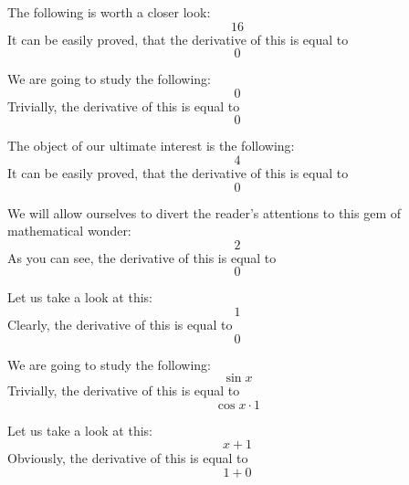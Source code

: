 \documentclass{article}
\begin{document}
The following is worth a closer look:
\begin{equation}
16 
\end{equation}
It can be easily proved, that the derivative of this is equal to
\begin{equation}
0 
\end{equation}

We are going to study the following:
\begin{equation}
0 
\end{equation}
Trivially, the derivative of this is equal to
\begin{equation}
0 
\end{equation}

The object of our ultimate interest is the following:
\begin{equation}
4 
\end{equation}
It can be easily proved, that the derivative of this is equal to
\begin{equation}
0 
\end{equation}

We will allow ourselves to divert the reader's attentions to this gem of mathematical wonder:
\begin{equation}
2 
\end{equation}
As you can see, the derivative of this is equal to
\begin{equation}
0 
\end{equation}

Let us take a look at this:
\begin{equation}
1 
\end{equation}
Clearly, the derivative of this is equal to
\begin{equation}
0 
\end{equation}

We are going to study the following:
\begin{equation}
\sin x 
\end{equation}
Trivially, the derivative of this is equal to
\begin{equation}
\cos x \cdot 1 
\end{equation}

Let us take a look at this:
\begin{equation}
x + 1 
\end{equation}
Obviously, the derivative of this is equal to
\begin{equation}
1 + 0 
\end{equation}
\end{document}
